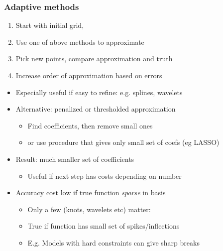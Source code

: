 \documentclass[bigger]{beamer}
\begin{document}
\begin{frame}%

\frametitle{Adaptive methods}

\begin{enumerate}
\item Start with initial grid, 
\item Use one of above methods to approximate 
\item Pick new points, compare approximation and truth
\item Increase order of approximation based on errors
\end{enumerate}

\begin{itemize}
\item Especially useful if easy to refine: e.g. splines, wavelets
\item Alternative: penalized or thresholded approximation
\begin{itemize}
\item Find coefficients, then remove small ones
\item or use procedure that gives only small set of coefs (eg LASSO)
\end{itemize}
\item Result: much smaller set of coefficients
\begin{itemize}
\item Useful if next step has costs depending on number
\end{itemize}
\item Accuracy cost low if true function \emph{sparse} in basis
\begin{itemize}
\item Only a few (knots, wavelets etc) matter: 
\item True if function has small set of spikes/inflections
\item E.g. Models with hard constraints can give sharp breaks
\end{itemize}

\end{itemize}



\end{frame}%
\end{document}

